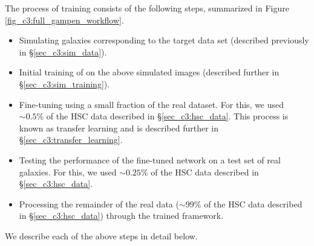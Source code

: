 The process of training \gampen{} consists of the following steps, summarized in Figure \ref{fig_c3:full_gampen_workflow}.
\begin{itemize}
\item Simulating galaxies corresponding to the target data set (described previously in \S \ref{sec_c3:sim_data}).
\item Initial training of \gampen{} on the above simulated images (described further in \S \ref{sec_c3:sim_training}).
\item Fine-tuning \gampen{} using a small fraction of the real dataset. For this, we used $\sim0.5\%$ of the HSC data described in \S \ref{sec_c3:hsc_data}. This process is known as transfer learning and is described further in \S \ref{sec_c3:transfer_learning}.
\item Testing the performance of the fine-tuned network on a test set of real galaxies. For this, we used $\sim0.25\%$ of the HSC data described in \S \ref{sec_c3:hsc_data}.
\item Processing the remainder of the real data ($\sim99\%$ of the HSC data described in \S \ref{sec_c3:hsc_data}) through the trained framework.
\end{itemize}

We describe each of the above steps in detail below. 







